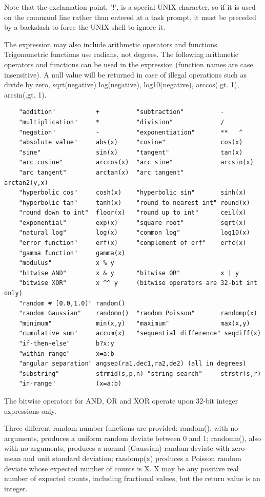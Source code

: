 \documentclass[11pt]{book}
\begin{document}
Note that the exclamation point, '!', is a special UNIX character, so
if it is used on the command line rather than entered at a task
prompt, it must be preceded by a backslash to force the UNIX shell to
ignore it.

The expression may  also include arithmetic operators and functions.
Trigonometric  functions use  radians,  not degrees.  The  following
arithmetic  operators and  functions  can be  used in the expression
(function names are case insensitive).  A null value will be returned
in case of illegal operations such as divide by zero, sqrt(negative)
log(negative), log10(negative), arccos(.gt. 1), arcsin(.gt. 1).

\begin{verbatim}
    "addition"           +          "subtraction"          -
    "multiplication"     *          "division"             /
    "negation"           -          "exponentiation"       **   ^
    "absolute value"     abs(x)     "cosine"               cos(x)
    "sine"               sin(x)     "tangent"              tan(x)
    "arc cosine"         arccos(x)  "arc sine"             arcsin(x)
    "arc tangent"        arctan(x)  "arc tangent"          arctan2(y,x)
    "hyperbolic cos"     cosh(x)    "hyperbolic sin"       sinh(x)
    "hyperbolic tan"     tanh(x)    "round to nearest int" round(x)
    "round down to int"  floor(x)   "round up to int"      ceil(x)
    "exponential"        exp(x)     "square root"          sqrt(x)
    "natural log"        log(x)     "common log"           log10(x)
    "error function"     erf(x)     "complement of erf"    erfc(x)
    "gamma function"     gamma(x)
    "modulus"            x % y      
    "bitwise AND"        x & y      "bitwise OR"           x | y
    "bitwise XOR"        x ^^ y     (bitwise operators are 32-bit int only)
    "random # [0.0,1.0)" random()
    "random Gaussian"    randomn()  "random Poisson"       randomp(x)
    "minimum"            min(x,y)   "maximum"              max(x,y)
    "cumulative sum"     accum(x)   "sequential difference" seqdiff(x)
    "if-then-else"       b?x:y
    "within-range"       x=a:b
    "angular separation" angsep(ra1,dec1,ra2,de2) (all in degrees)
    "substring"          strmid(s,p,n) "string search"     strstr(s,r)
    "in-range"           (x=a:b)
\end{verbatim}
The bitwise operators for AND, OR and XOR operate upon 32-bit integer 
expressions only.

Three different random number functions are provided: random(), with
no arguments, produces a uniform random deviate between 0 and 1;
randomn(), also with no arguments, produces a normal (Gaussian) random
deviate with zero mean and unit standard deviation; randomp(x)
produces a Poisson random deviate whose expected number of counts is
X.  X may be any positive real number of expected counts, including
fractional values, but the return value is an integer.
\end{document}
